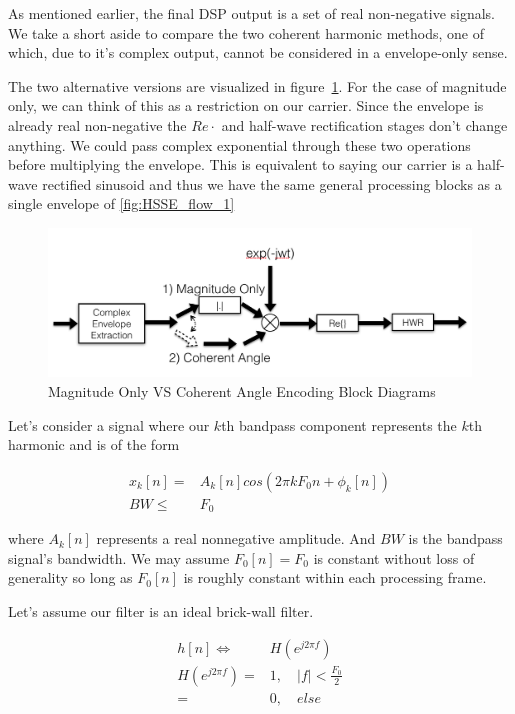 \documentclass [11pt, proquest] {uwthesis}[2015/03/03]
\begin{document}
As mentioned earlier, the final DSP output is a set of real non-negative signals.  We take a short aside to compare the two coherent harmonic methods, one of which, due to it's complex output, cannot be considered in a envelope-only sense.

The two alternative versions are visualized in figure~\ref{fig:coherent_angle}.  For the case of magnitude only, we can think of this as a restriction on our carrier.  Since the envelope is already real non-negative the $Re{\cdot}$ and half-wave rectification stages don't change anything.  We could pass complex exponential through these two operations before multiplying the envelope.  This is equivalent to saying our carrier is a half-wave rectified sinusoid and thus we have the same general processing blocks as a single envelope of \ref{fig:HSSE_flow_1}

\begin{figure}[!ht]
  \centering
    \includegraphics[width=1\textwidth]{coherent_angle}   
    \caption{Magnitude Only VS Coherent Angle Encoding Block Diagrams}
    \label{fig:coherent_angle}
\end{figure}

Let's consider a signal where our $k$th bandpass component represents the $k$th harmonic and is of the form

\begin{align}
x_k[n] =& A_k[n]cos(2\pi kF_0n + \phi_k[n]) \\
BW \leq& F_0 \nonumber
\end{align}

where $A_k[n]$ represents a real nonnegative amplitude.  And $BW$ is the bandpass signal's bandwidth.  We may assume $F_0[n] = F_0$ is constant without loss of generality so long as $F_0[n]$ is roughly constant within each processing frame.

Let's assume our filter is an ideal brick-wall filter.

\begin{align}
h[n] \Longleftrightarrow& H(e^{j2\pi f}) \\
H(e^{j2\pi f}) =& 1, \quad |f| < \frac{F_0}{2} \\
=& 0, \quad else \nonumber
\end{align}
\end{document}

